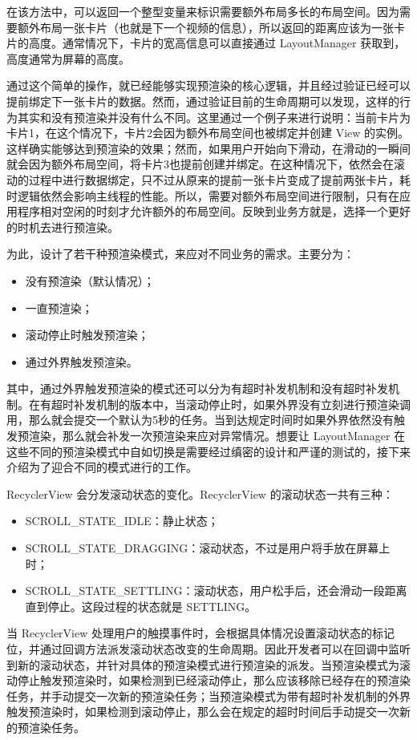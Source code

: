 在该方法中，可以返回一个整型变量来标识需要额外布局多长的布局空间。因为需要额外布局一张卡片（也就是下一个视频的信息），所以返回的距离应该为一张卡片的高度。通常情况下，卡片的宽高信息可以直接通过 LayoutManager 获取到，高度通常为屏幕的高度。

通过这个简单的操作，就已经能够实现预渲染的核心逻辑，并且经过验证已经可以提前绑定下一张卡片的数据。然而，通过验证目前的生命周期可以发现，这样的行为其实和没有预渲染并没有什么不同。这里通过一个例子来进行说明：当前卡片为卡片1，在这个情况下，卡片2会因为额外布局空间也被绑定并创建 View 的实例。这样确实能够达到预渲染的效果；然而，如果用户开始向下滑动，在滑动的一瞬间就会因为额外布局空间，将卡片3也提前创建并绑定。在这种情况下，依然会在滚动的过程中进行数据绑定，只不过从原来的提前一张卡片变成了提前两张卡片，耗时逻辑依然会影响主线程的性能。所以，需要对额外布局空间进行限制，只有在应用程序相对空闲的时刻才允许额外的布局空间。反映到业务方就是，选择一个更好的时机去进行预渲染。

为此，设计了若干种预渲染模式，来应对不同业务的需求。主要分为：

\begin{itemize}
    \item 没有预渲染（默认情况）；
    \item 一直预渲染；
    \item 滚动停止时触发预渲染；
    \item 通过外界触发预渲染。
\end{itemize}

其中，通过外界触发预渲染的模式还可以分为有超时补发机制和没有超时补发机制。在有超时补发机制的版本中，当滚动停止时，如果外界没有立刻进行预渲染调用，那么就会提交一个默认为5秒的任务。当到达规定时间时如果外界依然没有触发预渲染，那么就会补发一次预渲染来应对异常情况。想要让 LayoutManager 在这些不同的预渲染模式中自如切换是需要经过缜密的设计和严谨的测试的，接下来介绍为了迎合不同的模式进行的工作。

RecyclerView 会分发滚动状态的变化。RecyclerView 的滚动状态一共有三种：

\begin{itemize}
    \item SCROLL\_STATE\_IDLE：静止状态；
    \item SCROLL\_STATE\_DRAGGING：滚动状态，不过是用户将手放在屏幕上时；
    \item SCROLL\_STATE\_SETTLING：滚动状态，用户松手后，还会滑动一段距离直到停止。这段过程的状态就是 SETTLING。
\end{itemize}

当 RecyclerView 处理用户的触摸事件时，会根据具体情况设置滚动状态的标记位，并通过回调方法派发滚动状态改变的生命周期。因此开发者可以在回调中监听到新的滚动状态，并针对具体的预渲染模式进行预渲染的派发。当预渲染模式为滚动停止触发预渲染时，如果检测到已经滚动停止，那么应该移除已经存在的预渲染任务，并手动提交一次新的预渲染任务；当预渲染模式为带有超时补发机制的外界触发预渲染时，如果检测到滚动停止，那么会在规定的超时时间后手动提交一次新的预渲染任务。

